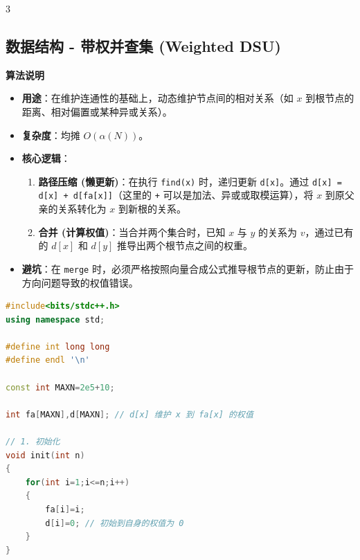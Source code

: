 \documentclass[10pt,landscape,a4paper]{article}
\begin{document}
\begin{multicols*}{3}
\subsection*{数据结构 - 带权并查集 (Weighted DSU)}
\par\addvspace{0.7ex}\noindent\textbf{算法说明}\par\nobreak
\begin{itemize}
\item \textbf{用途}：在维护连通性的基础上，动态维护节点间的相对关系（如 $x$ 到根节点的距离、相对偏置或某种异或关系）。
\item \textbf{复杂度}：均摊 $O(\alpha(N))$。
\item \textbf{核心逻辑}：
\begin{enumerate}[start=1]
\item \textbf{路径压缩 (懒更新)}：在执行 \texttt{f\allowbreak{}i\allowbreak{}n\allowbreak{}d\allowbreak{}(\allowbreak{}x\allowbreak{})} 时，递归更新 \texttt{d\allowbreak{}[\allowbreak{}x\allowbreak{}]}。通过 \texttt{d\allowbreak{}[\allowbreak{}x\allowbreak{}]\allowbreak{} \allowbreak{}=\allowbreak{} \allowbreak{}d\allowbreak{}[\allowbreak{}x\allowbreak{}]\allowbreak{} \allowbreak{}+\allowbreak{} \allowbreak{}d\allowbreak{}[\allowbreak{}f\allowbreak{}a\allowbreak{}[\allowbreak{}x\allowbreak{}]\allowbreak{}]}（这里的 \texttt{+} 可以是加法、异或或取模运算），将 $x$ 到原父亲的关系转化为 $x$ 到新根的关系。
\item \textbf{合并 (计算权值)}：当合并两个集合时，已知 $x$ 与 $y$ 的关系为 $v$，通过已有的 $d[x]$ 和 $d[y]$ 推导出两个根节点之间的权重。
\end{enumerate}
\item \textbf{避坑}：在 \texttt{m\allowbreak{}e\allowbreak{}r\allowbreak{}g\allowbreak{}e} 时，必须严格按照向量合成公式推导根节点的更新，防止由于方向问题导致的权值错误。
\end{itemize}
\par{}\par
\begin{lstlisting}[language=C++]
#include<bits/stdc++.h>
using namespace std;

#define int long long
#define endl '\n'

const int MAXN=2e5+10;

int fa[MAXN],d[MAXN]; // d[x] 维护 x 到 fa[x] 的权值

// 1. 初始化
void init(int n)
{
    for(int i=1;i<=n;i++)
    {
        fa[i]=i;
        d[i]=0; // 初始到自身的权值为 0
    }
}


\end{lstlisting}
\end{multicols*}
\end{document}
